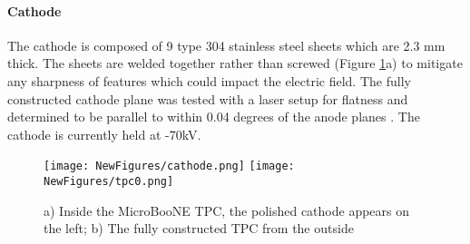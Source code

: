 \documentclass[12pt]{article}
\begin{document}
%

\paragraph{Cathode} 
\par The cathode is composed of 9 type 304 stainless steel sheets which are 2.3 mm thick.  The sheets are welded together rather than screwed (Figure \ref{fig:cathodeShine}a) to mitigate any sharpness of features which could impact the electric field. The fully constructed cathode plane was tested with a laser setup for flatness and determined to be parallel to within 0.04 degrees of the anode planes \cite{bib:uboone_JINST} . The cathode is currently held at -70kV.  

\begin{figure}[h!]
\centering
\texttt{[image: NewFigures/cathode.png]}
\hspace{3 mm}
\texttt{[image: NewFigures/tpc0.png]}
\caption{a) Inside the MicroBooNE TPC, the polished cathode appears on the left; b) The fully constructed TPC from the outside }
\label{fig:cathodeShine}
\end{figure}
\end{document}
